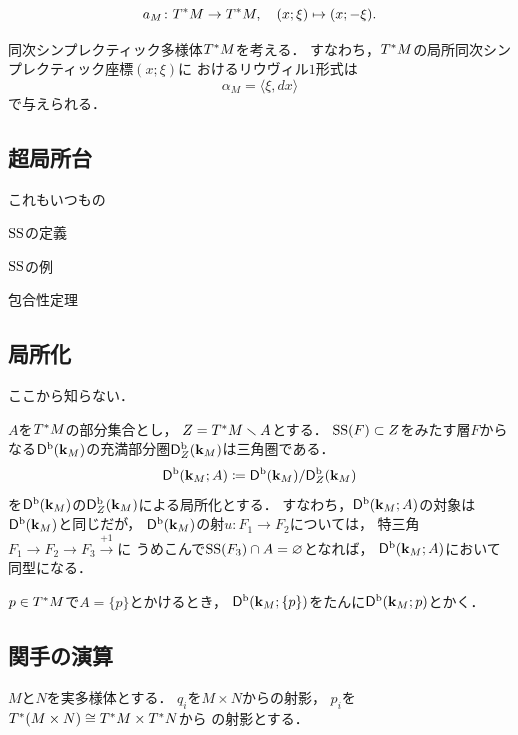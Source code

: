 \begin{equation}
    a_M\colon \cotb[M]\to\cotb[M],\quad(x;\xi)\mapsto(x;-\xi).
\end{equation}

同次シンプレクティック多様体\(\cotb[M]\)を考える．
すなわち，\(\cotb[M]\)の局所同次シンプレクティック座標\((x;\xi)\)に
おけるリウヴィル\(1\)形式は\[
    \alpha_M=\langle{\xi},dx\rangle
\]で与えられる．







\subsection{超局所台{\cite[5.1,6.5節]{KS90}}}
これもいつもの
\begin{DFN}\label{def11}
    \(\muS\)の定義
\end{DFN}
\begin{EG}\label{eg12}
    \(\muS\)の例
\end{EG}
\begin{THM}\label{thm13}
    包合性定理
\end{THM}
\subsection{局所化{\cite[6.1節]{KS90}}}
ここから知らない．

\(A\)を\(\cotb[M]\)の部分集合とし，
\(Z=\cotb[M]\smallsetminus A\)とする．
\(\muS(F)\subset Z\)をみたす層\(F\)からなる\(
    \Dompb(\kk_{M})
\)の充満部分圏\(\mucat[Z]{\kk_M}\)は三角圏である．
\[
    \Dompb(\kk_M;A)\coloneqq \Dompb(\kk_M)/\mucat[Z]{\kk_M}
\]
を\(\Dompb(\kk_M)\)の\(\mucat[Z]{\kk_M}\)による局所化とする．
すなわち，\(\Dompb(\kk_M;A)\)の対象は\(\Dompb(\kk_M)\)と同じだが，
\(\Dompb(\kk_M)\)の射\(u\colon F_1\to F_2\)については，
特三角\(F_1\to F_2\to F_3\overset{+1}{\longrightarrow}\)に
うめこんで\(\muS(F_3)\cap A=\varnothing\)となれば，
\(\Dompb(\kk_M;A)\)において同型になる．

\(p\in \cotb[M]\)で\(A=\{p\}\)とかけるとき，
\(\Dompb(\kk_M;\{p\})\)をたんに\(\Dompb(\kk_M;p)\)とかく．

\subsection{関手の演算{\cite[5.4節]{KS90}}}

\(M\)と\(N\)を実多様体とする．
\(q_i\)を\(M\times N\)からの射影，
\(p_i\)を\(\cotb[(M\times N)]\cong\cotb[M]\times \cotb[N]\)から
の射影とする．

